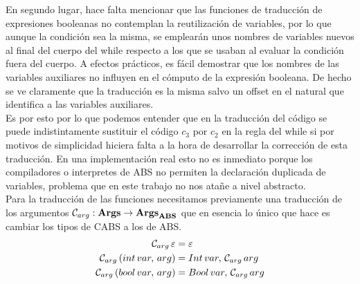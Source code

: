 En segundo lugar, hace falta mencionar que las funciones de traducción de expresiones booleanas no contemplan la reutilización de variables, por lo que aunque la condición sea la misma, se emplearán unos nombres de variables nuevos al final del cuerpo del while respecto a los que se usaban al evaluar la condición fuera del cuerpo. A efectos prácticos, es fácil demostrar que los nombres de las variables auxiliares no influyen en el cómputo de la expresión booleana. De hecho se ve claramente que la traducción es la misma salvo un offset en el natural que identifica a las variables auxiliares.\\

Es por esto por lo que podemos entender que en la traducción del código se puede indistintamente sustituir el código $c_3$ por $c_2$ en la regla del while si por motivos de simplicidad hiciera falta a la hora de desarrollar la corrección de esta traducción. En una implementación real esto no es inmediato porque los compiladores o interpretes de ABS no permiten la declaración duplicada de variables, problema que en este trabajo no nos atañe a nivel abstracto.\\

Para la traducción de las funciones necesitamos previamente una traducción de los argumentos $\mathcal{C}_{arg}: \textbf{Args} \rightarrow \textbf{Args}_{\textbf{ABS}}$ que en esencia lo único que hace es cambiar los tipos de CABS a los de ABS.
\begin{align*}
  \mathcal{C}_{arg}\,\varepsilon &= \varepsilon\\
  \mathcal{C}_{arg}\, (int \, var,\,arg) &= Int\,var,\,\mathcal{C}_{arg}\, arg\\
  \mathcal{C}_{arg}\, (bool \, var,\,arg) &= Bool\,var,\,\mathcal{C}_{arg}\, arg
\end{align*}

